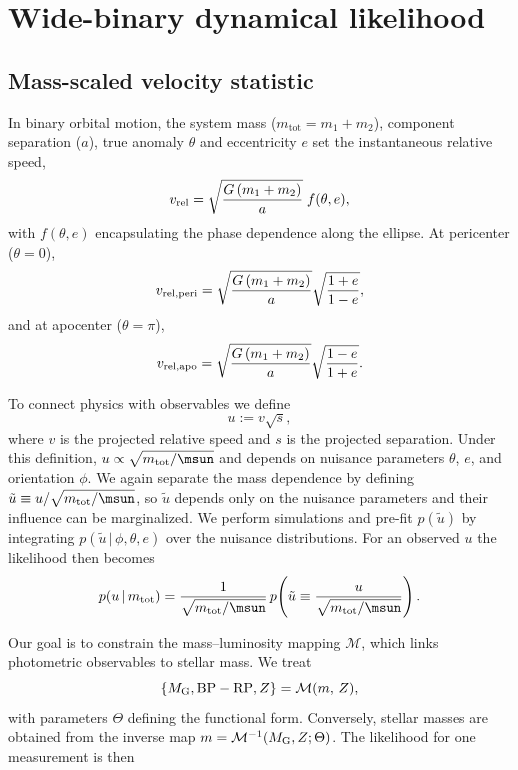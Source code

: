 \section{Wide-binary dynamical likelihood}
\label{sec:dynamics}

\subsection{Mass-scaled velocity statistic}

In binary orbital motion, the system mass ($m_{\mathrm{tot}} = m_1+m_2$), component separation ($a$), true anomaly $\theta$ and eccentricity $e$ set the instantaneous relative speed,
\begin{equation}
    v_{\rm rel} = \sqrt{\frac{G\,(m_1+m_2)}{a}}\; f(\theta,e),
\end{equation}
with $f(\theta,e)$ encapsulating the phase dependence along the ellipse. At pericenter ($\theta=0$),
\begin{equation}
    v_{\rm rel,peri} = \sqrt{\frac{G\,(m_1+m_2)}{a}} \sqrt{\frac{1+e}{1-e}},
\end{equation}
and at apocenter ($\theta=\pi$),
\begin{equation}
    v_{\rm rel,apo} = \sqrt{\frac{G\,(m_1+m_2)}{a}} \sqrt{\frac{1-e}{1+e}}.
\end{equation}

To connect physics with observables we define
\begin{equation}
    u := v \sqrt{s},
\end{equation}
where $v$ is the projected relative speed and $s$ is the projected separation. Under this definition, $u \propto \sqrt{m_{\rm tot}/\msun}$ and depends on nuisance parameters $\theta$, $e$, and orientation $\phi$. We again separate the mass dependence by defining $\tilde{u} \equiv u/\sqrt{m_{\rm tot}/\msun}$, so $\tilde{u}$ depends only on the nuisance parameters and their influence can be marginalized. We perform simulations and pre-fit $p(\tilde{u})$ by integrating $p(\tilde{u}\,|\,\phi,\theta,e)$ over the nuisance distributions. For an observed $u$ the likelihood then becomes
\begin{equation}
    p(u\,|\,m_{\rm tot}) = \frac{1}{\sqrt{m_{\rm tot}/\msun}}\,p\!\left(\tilde{u} \equiv \frac{u}{\sqrt{m_{\rm tot}/\msun}}\right).
\end{equation}

Our goal is to constrain the mass--luminosity mapping $\mathcal{M}$, which links photometric observables to stellar mass. We treat
\begin{equation}
    \{M_{\rm G}, {\rm BP-RP}, Z\} = \mathcal{M}(m,\,Z),
\end{equation}
with parameters $\Theta$ defining the functional form.  Conversely, stellar
masses are obtained from the inverse map
$m=\mathcal{M}^{-1}(M_{\rm G},Z;\Theta)$. The likelihood for one measurement is then

